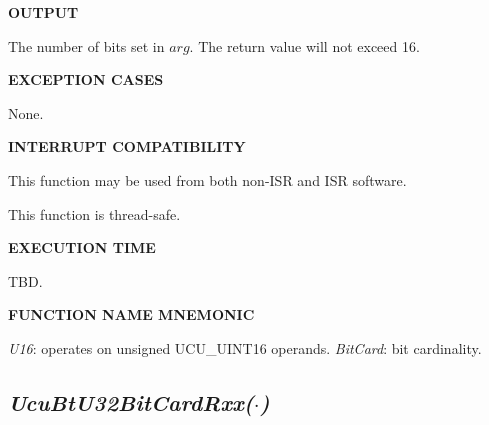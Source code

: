 \noindent\textbf{OUTPUT}
\begin{list}{}{\setlength{\leftmargin}{0.25in}\setlength{\topsep}{0.0in}}
\item  The number of bits set in $arg$.  The return value will not exceed 16.
\end{list}
\vspace{2.8ex}

\noindent\textbf{EXCEPTION CASES}
\begin{list}{}{\setlength{\leftmargin}{0.25in}\setlength{\topsep}{0.0in}}
\item None.
\end{list}
\vspace{2.8ex}

\noindent\textbf{INTERRUPT COMPATIBILITY}
\begin{list}{}{\setlength{\leftmargin}{0.25in}\setlength{\topsep}{0.0in}}
\item This function may be used from both non-ISR and ISR software.
\item This function is thread-safe.
\end{list}
\vspace{2.8ex}

\noindent\textbf{EXECUTION TIME}
\begin{list}{}{\setlength{\leftmargin}{0.25in}\setlength{\topsep}{0.0in}}
\item TBD.
\end{list}
\vspace{2.8ex}

\noindent\textbf{FUNCTION NAME MNEMONIC}
\begin{list}{}{\setlength{\leftmargin}{0.25in}\setlength{\topsep}{0.0in}}
\item \emph{U16}: operates on unsigned UCU\_UINT16 operands.
      \emph{BitCard}: bit cardinality.
\end{list}


\subsection[\emph{UcuBtU32BitCardRxx(\protect\mbox{\protect$\cdot$})}]
           {\emph{UcuBtU32BitCardRxx(\protect\mbox{\protect\boldmath $\cdot$})}}
\label{cbsf0:sbcf0:sbct0}

%


